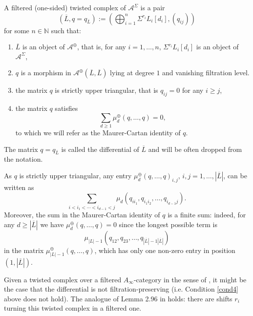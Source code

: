 \begin{dfn}\label{defFTW}
	A filtered (one-sided) twisted complex of $\mathcal{A}^\Sigma$ is a pair $$(\overline{L}, q=q_{\overline{L}}):= \left(\bigoplus_{i=1}^n \Sigma^{r_i}L_i[d_i], (q_{ij})\right)$$ for some $n\in \mathbb N$ such that:
	\begin{enumerate}
		\item $\overline{L}$ is an object of $\mathcal{A}^\oplus$, that is, for any $i=1,\ldots, n$, $ \Sigma^{r_i}L_i[d_i]$ is an object of $\mathcal{A}^\Sigma$,
		\item $q$ is a morphism in $\mathcal{A}^\oplus (\overline{L}, \overline{L})$ lying at degree $1$ and vanishing filtration level.
		\item the matrix $q$ is strictly upper triangular, that is $q_{ij}=0$ for any $i\geq j$,
		\item\label{cond4} the matrix $q$ satisfies $$\sum_{d\geq 1}\mu_d^\oplus (q,\ldots, q)=0,$$ 
		to which we will refer as the Maurer-Cartan identity of $q$.
	\end{enumerate}
	The matrix $q=q_{\overline{L}}$ is called the differential of $\overline{L}$ and will be often dropped from the notation.
\end{dfn}
\begin{rem} As $q$ is strictly upper triangular, any entry $\mu_d^\oplus(q,\ldots, q)_{i,j}$, $i,j=1,\ldots, |\overline{L}|$, can be written as $$\sum_{i<i_1<\cdots < i_{d-1}<j} \mu_d(q_{ii_1}, q_{i_1i_2},\ldots , q_{i_{d-1}j}).$$ Moreover, the sum in the Maurer-Cartan identity of $q$ is a finite sum: indeed, for any $d\geq |\overline{L}|$ we have $\mu_d^\oplus(q,\ldots, q)=0$ since the longest possible term is $$\mu_{|L|-1}(q_{12},q_{23},\ldots, q_{|\overline{L}|-1|\overline{L}|})$$ in the matrix $\mu^\oplus_{|L|-1}(q,\ldots, q)$, which has only one non-zero entry in position $(1,|\overline{L}|)$.
\end{rem}
\noindent Given a twisted complex over a filtered $A_\infty$-category in the sense of \cite[Section (3l) and Remark 3.26]{Se:book-fukaya-categ}, it might be the case that the differential is not filtration-preserving (i.e. Condition \ref{cond4} above does not hold). The analogue of Lemma 2.96 in \cite{BCZ:tpc} holds: there are shifts $r_i$ turning this twisted complex in a filtered one.

